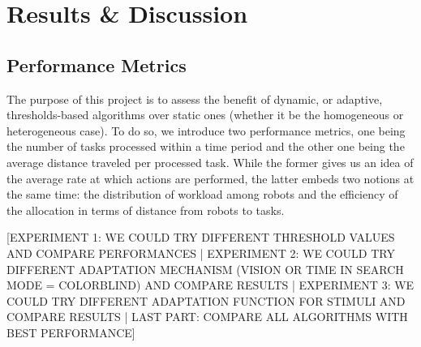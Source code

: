 \section{Results \& Discussion}

\subsection{Performance Metrics}
The purpose of this project is to assess the benefit of dynamic, or adaptive, thresholds-based algorithms over static ones (whether it be the homogeneous or heterogeneous case). To do so, we introduce two performance metrics, one being the number of tasks processed within a time period and the other one being the average distance traveled per processed task. While the former gives us an idea of the average rate at which actions are performed, the latter embeds two notions at the same time: the distribution of workload among robots and the efficiency of the allocation in terms of distance from robots to tasks.

[EXPERIMENT 1: WE COULD TRY DIFFERENT THRESHOLD VALUES AND COMPARE PERFORMANCES | EXPERIMENT 2: WE COULD TRY DIFFERENT ADAPTATION MECHANISM (VISION OR TIME IN SEARCH MODE = COLORBLIND) AND COMPARE RESULTS | EXPERIMENT 3: WE COULD TRY DIFFERENT ADAPTATION FUNCTION FOR STIMULI AND COMPARE RESULTS | LAST PART: COMPARE ALL ALGORITHMS WITH BEST PERFORMANCE]